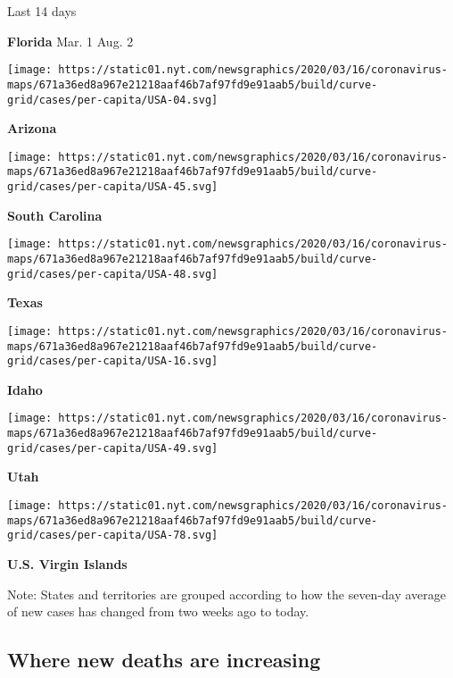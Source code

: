 Last 14 days

\textbf{Florida} Mar. 1 Aug. 2

\href{https://www.nytimes.com/interactive/2020/us/arizona-coronavirus-cases.html}{}

\texttt{[image: https://static01.nyt.com/newsgraphics/2020/03/16/coronavirus-maps/671a36ed8a967e21218aaf46b7af97fd9e91aab5/build/curve-grid/cases/per-capita/USA-04.svg]}

\textbf{Arizona}

\href{https://www.nytimes.com/interactive/2020/us/south-carolina-coronavirus-cases.html}{}

\texttt{[image: https://static01.nyt.com/newsgraphics/2020/03/16/coronavirus-maps/671a36ed8a967e21218aaf46b7af97fd9e91aab5/build/curve-grid/cases/per-capita/USA-45.svg]}

\textbf{South Carolina}

\href{https://www.nytimes.com/interactive/2020/us/texas-coronavirus-cases.html}{}

\texttt{[image: https://static01.nyt.com/newsgraphics/2020/03/16/coronavirus-maps/671a36ed8a967e21218aaf46b7af97fd9e91aab5/build/curve-grid/cases/per-capita/USA-48.svg]}

\textbf{Texas}

\href{https://www.nytimes.com/interactive/2020/us/idaho-coronavirus-cases.html}{}

\texttt{[image: https://static01.nyt.com/newsgraphics/2020/03/16/coronavirus-maps/671a36ed8a967e21218aaf46b7af97fd9e91aab5/build/curve-grid/cases/per-capita/USA-16.svg]}

\textbf{Idaho}

\href{https://www.nytimes.com/interactive/2020/us/utah-coronavirus-cases.html}{}

\texttt{[image: https://static01.nyt.com/newsgraphics/2020/03/16/coronavirus-maps/671a36ed8a967e21218aaf46b7af97fd9e91aab5/build/curve-grid/cases/per-capita/USA-49.svg]}

\textbf{Utah}

\texttt{[image: https://static01.nyt.com/newsgraphics/2020/03/16/coronavirus-maps/671a36ed8a967e21218aaf46b7af97fd9e91aab5/build/curve-grid/cases/per-capita/USA-78.svg]}

\textbf{U.S. Virgin Islands}

Note: States and territories are grouped according to how the seven-day
average of new cases has changed from two weeks ago to today.

\hypertarget{where-new-deaths-are-increasing}{%
\subsection{Where new deaths are
increasing}\label{where-new-deaths-are-increasing}}


